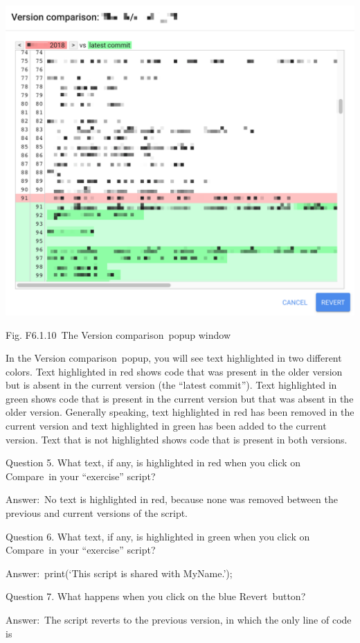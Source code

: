 \documentclass[
  letterpaper,
  DIV=11,
  numbers=noendperiod]{scrreprt}
\begin{document}
\includegraphics{./F6/image30.png}

Fig. F6.1.10~The Version comparison~popup window

In the Version comparison~popup, you will see text highlighted in two
different colors. Text highlighted in red shows code that was present in
the older version but is absent in the current version (the ``latest
commit''). Text highlighted in green shows code that is present in the
current version but that was absent in the older version. Generally
speaking, text highlighted in red has been removed in the current
version and text highlighted in green has been added to the current
version. Text that is not highlighted shows code that is present in both
versions.

Question 5. What text, if any, is highlighted in red when you click on
Compare~in your ``exercise'' script?

Answer:~No text is highlighted in red, because none was removed between
the previous and current versions of the script.

Question 6. What text, if any, is highlighted in green when you click on
Compare~in your ``exercise'' script?

Answer:~print(`This script is shared with MyName.');

Question 7. What happens when you click on the blue Revert~button?

Answer:~The script reverts to the previous version, in which the only
line of code is
\end{document}
